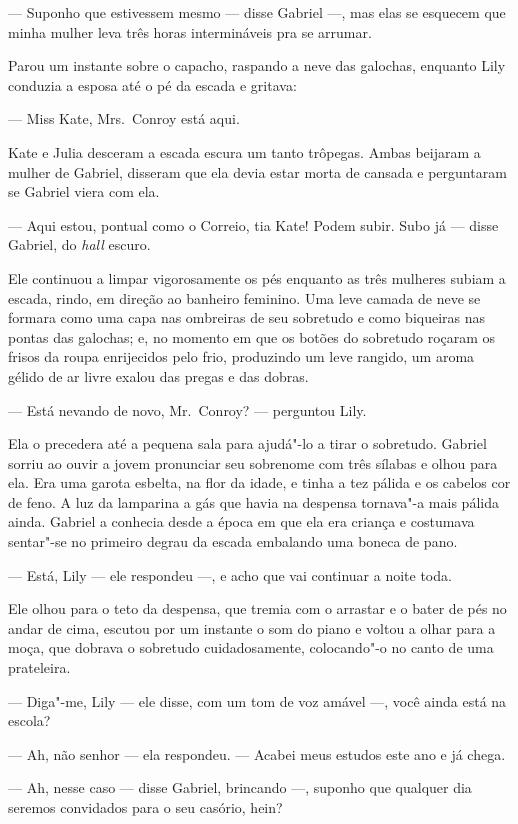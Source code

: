 --- Suponho que estivessem mesmo --- disse Gabriel ---, mas elas se esquecem
que minha mulher leva três horas intermináveis pra se arrumar.

Parou um instante sobre o capacho, raspando a neve das galochas, enquanto Lily
conduzia a esposa até o pé da escada e gritava:

--- Miss Kate, Mrs.~Conroy está aqui.

Kate e Julia desceram a escada escura um tanto trôpegas.  Ambas beijaram a
mulher de Gabriel, disseram que ela devia estar morta de cansada e perguntaram
se Gabriel viera com ela.

--- Aqui estou, pontual como o Correio, tia Kate!  Podem subir.  Subo já ---
disse Gabriel, do \textit{hall} escuro.

Ele continuou a limpar vigorosamente os pés enquanto as três mulheres subiam a
escada, rindo, em direção ao banheiro feminino.  Uma leve camada de neve se
formara como uma capa nas ombreiras de seu sobretudo e como biqueiras nas
pontas das galochas; e, no momento em que os botões do sobretudo roçaram os
frisos da roupa enrijecidos pelo frio, produzindo um leve rangido, um aroma
gélido de ar livre exalou das pregas e das dobras.

--- Está nevando de novo, Mr.~Conroy? --- perguntou Lily.

Ela o precedera até a pequena sala para ajudá"-lo a tirar o sobretudo.  Gabriel
sorriu ao ouvir a jovem pronunciar seu sobrenome com três sílabas e olhou para
ela.  Era uma garota esbelta, na flor da idade, e tinha a tez pálida e os
cabelos cor de feno.  A luz da lamparina a gás que havia na despensa tornava"-a
mais pálida ainda.  Gabriel a conhecia desde a época em que ela era criança e
costumava sentar"-se no primeiro degrau da escada embalando uma boneca de pano.

--- Está, Lily --- ele respondeu ---, e acho que vai continuar a noite toda.

Ele olhou para o teto da despensa, que tremia com o arrastar e o bater de pés no
andar de cima, escutou por um instante o som do piano e voltou a olhar para a
moça, que dobrava o sobretudo cuidadosamente, colocando"-o no canto de uma
prateleira.

--- Diga"-me, Lily --- ele disse, com um tom de voz amável ---, você ainda está
na escola?

--- Ah, não senhor --- ela respondeu.  --- Acabei meus estudos este ano e já
chega.

--- Ah, nesse caso --- disse Gabriel, brincando ---, suponho que qualquer dia
seremos convidados para o seu casório, hein?

